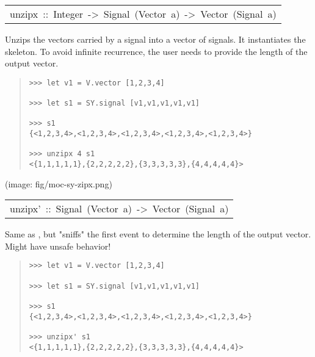 \begin{haddockdesc}
\item[\begin{tabular}{@{}l}
unzipx\ ::\ Integer\ ->\ Signal\ (Vector\ a)\ ->\ Vector\ (Signal\ a)
\end{tabular}]\haddockbegindoc
Unzips the vectors carried by a signal into a vector of
 signals. It instantiates the 
 skeleton. To avoid infinite recurrence, the user needs to provide
 the length of the output vector.\par
\begin{quote}
{\haddockverb\begin{verbatim}
>>> let v1 = V.vector [1,2,3,4]

>>> let s1 = SY.signal [v1,v1,v1,v1,v1]

>>> s1
{<1,2,3,4>,<1,2,3,4>,<1,2,3,4>,<1,2,3,4>,<1,2,3,4>}

>>> unzipx 4 s1
<{1,1,1,1,1},{2,2,2,2,2},{3,3,3,3,3},{4,4,4,4,4}>

\end{verbatim}}
\end{quote}(image: fig/moc-sy-zipx.png)\par
           
\end{haddockdesc}
\begin{haddockdesc}
\item[\begin{tabular}{@{}l}
unzipx'\ ::\ Signal\ (Vector\ a)\ ->\ Vector\ (Signal\ a)
\end{tabular}]\haddockbegindoc
Same as , but "sniffs" the first event to determine the length of the output vector. Might have unsafe behavior!\par
\begin{quote}
{\haddockverb\begin{verbatim}
>>> let v1 = V.vector [1,2,3,4]

>>> let s1 = SY.signal [v1,v1,v1,v1,v1]

>>> s1
{<1,2,3,4>,<1,2,3,4>,<1,2,3,4>,<1,2,3,4>,<1,2,3,4>}

>>> unzipx' s1
<{1,1,1,1,1},{2,2,2,2,2},{3,3,3,3,3},{4,4,4,4,4}>

\end{verbatim}}
\end{quote}
\end{haddockdesc}